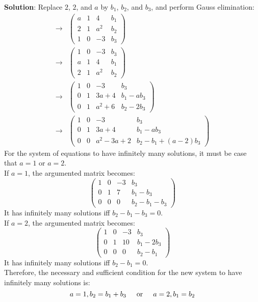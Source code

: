 \documentclass{article}
\begin{document}
\begin{enumerate}
\begin{enumerate}
            \textbf{Solution}: Replace $2$, $2$, and $a$ by $b_1$, $b_2$, and $b_3$, and perform Gauss elimination:
            \begin{align*}
                \rightarrow & \left(\begin{array}{ccc|c} a &1 &4 &b_1\\2 &1 &a^2 &b_2\\1 &0 &-3 &b_3 \end{array}\right) \\
                \rightarrow & \left(\begin{array}{ccc|c} 1 &0 &-3 &b_3\\a &1 &4 &b_1\\2 &1 &a^2 &b_2 \end{array}\right) \\
                \rightarrow & \left(\begin{array}{ccc|c} 1 &0 &-3 &b_3\\0 &1 &3a+4 &b_1-ab_3\\0 &1 &a^2+6 &b_2-2b_3 \end{array}\right) \\
                \rightarrow & \left(\begin{array}{ccc|c} 1 &0 &-3 &b_3\\0 &1 &3a+4 &b_1-ab_3\\0 &0 &a^2-3a+2 &b_2-b_1+(a-2)b_3 \end{array}\right) 
            \end{align*}
            For the system of equations to have infinitely many solutions, it must be case that $a=1$ or $a=2$. \\
            
            If $a=1$,  the argumented matrix becomes:
            $$\left(\begin{array}{ccc|c} 1 &0 &-3 &b_3\\0 &1 &7 &b_1-b_3\\0 &0 &0 &b_2-b_1-b_3 \end{array}\right)$$
            It has infinitely many solutions iff $b_2-b_1-b_3=0$. \\
            
            If $a=2$,  the argumented matrix becomes:
            $$\left(\begin{array}{ccc|c} 1 &0 &-3 &b_3\\0 &1 &10 &b_1-2b_3\\0 &0 &0 &b_2-b_1 \end{array}\right)$$
            It has infinitely many solutions iff $b_2-b_1=0$. \\
            
            Therefore, the necessary and sufficient condition for the new system to have infinitely many solutions is:
            $$a=1,b_2=b_1+b_3\hspace{0.2in}\textrm{or}\hspace{0.2in} a=2,b_1=b_2$$
            
        \end{enumerate}


\end{enumerate}
\end{document}
